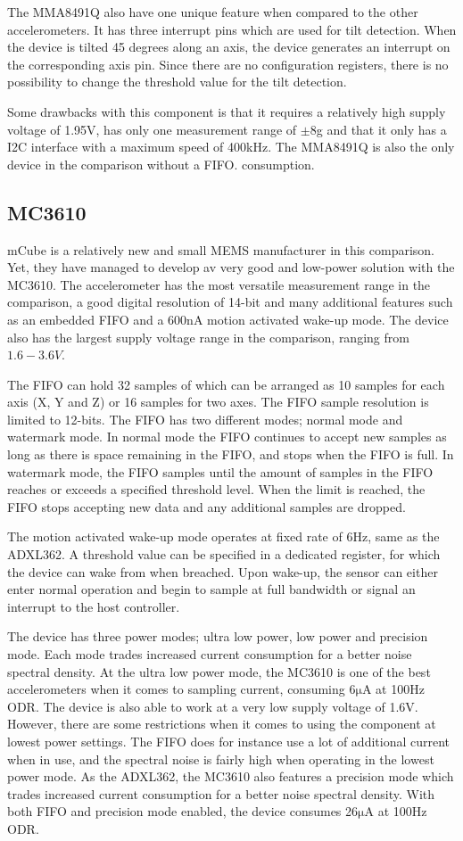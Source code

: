 The MMA8491Q also have one unique feature when compared to the other accelerometers. It has three interrupt pins which are used for tilt detection. When the device is tilted 45 degrees along an axis, the device generates an interrupt on the corresponding axis pin. Since there are no configuration registers, there is no possibility to change the threshold value for the tilt detection. 

Some drawbacks with this component is that it requires a relatively high supply voltage of 1.95V, has only one measurement range of $\pm$8g and that it only has a I2C interface with a maximum speed of 400kHz. The MMA8491Q is also the only device in the comparison without a FIFO. consumption.

\subsection{MC3610}
mCube is a relatively new and small MEMS manufacturer in this comparison. Yet, they have managed to develop av very good and low-power solution with the MC3610. The accelerometer has the most versatile measurement range in the comparison, a good digital resolution of 14-bit and many additional features such as an embedded FIFO and a 600nA motion activated wake-up mode. The device also has the largest supply voltage range in the comparison, ranging from $1.6-3.6V$.

The FIFO can hold 32 samples of which can be arranged as 10 samples for each axis (X, Y and Z) or 16 samples for two axes. The FIFO sample resolution is limited to 12-bits. The FIFO has two different modes; normal mode and watermark mode. In normal mode the FIFO continues to accept new samples as long as there is space remaining in the FIFO, and stops when the FIFO is full. In watermark mode, the FIFO samples until the amount of samples in the FIFO reaches or exceeds a specified threshold level. When the limit is reached, the FIFO stops accepting new data and any additional samples are dropped.

The motion activated wake-up mode operates at fixed rate of 6Hz, same as the ADXL362. A threshold value can be specified in a dedicated register, for which the device can wake from when breached. Upon wake-up, the sensor can either enter normal operation and begin to sample at full bandwidth or signal an interrupt to the host controller.

The device has three power modes; ultra low power, low power and precision mode. Each mode trades increased current consumption for a better noise spectral density. At the ultra low power mode, the MC3610 is one of the best accelerometers when it comes to sampling current, consuming 6$\si{\micro\ampere}$ at 100Hz ODR. The device is also able to work at a very low supply voltage of 1.6V. However, there are some restrictions when it comes to using the component at lowest power settings. The FIFO does for instance use a lot of additional current when in use, and the spectral noise is fairly high when operating in the lowest power mode. As the ADXL362, the MC3610 also features a precision mode which trades increased current consumption for a better noise spectral density. With both FIFO and precision mode enabled, the device consumes 26$\si{\micro\ampere}$ at 100Hz ODR. 

